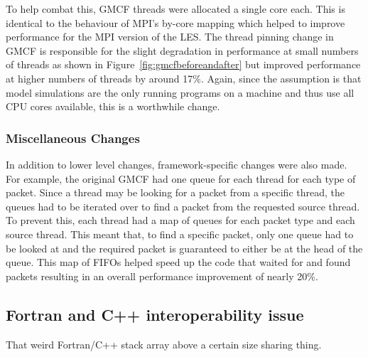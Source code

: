 To help combat this, GMCF threads were allocated a single core each. This is
identical to the behaviour of MPI's by-core mapping which helped to improve
performance for the MPI version of the LES. The thread pinning change in GMCF is
responsible for the slight degradation in performance at small numbers of
threads as shown in Figure~\ref{fig:gmcfbeforeandafter} but improved performance
at higher numbers of threads by around 17\%. Again, since the assumption is that
model simulations are the only running programs on a machine and thus use all
CPU cores available, this is a worthwhile change.

\subsubsection{Miscellaneous Changes}

In addition to lower level changes, framework-specific changes were also made.
For example, the original GMCF had one queue for each thread for each type of
packet. Since a thread may be looking for a packet from a specific thread, the
queues had to be iterated over to find a packet from the requested source
thread. To prevent this, each thread had a map of queues for each packet type
and each source thread. This meant that, to find a specific packet, only one
queue had to be looked at and the required packet is guaranteed to either be at
the head of the queue. This map of FIFOs helped speed up the code that waited
for and found packets resulting in an overall performance improvement of nearly
20\%.

\subsection{Fortran and C++ interoperability issue}
\label{sec:fortrancppinteroperability}

That weird Fortran/C++ stack array above a certain size sharing thing.

